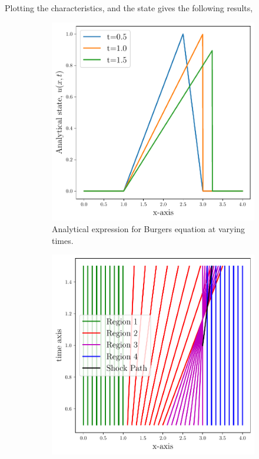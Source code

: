 \begin{adjustwidth}{2.5em}{0pt}
    Plotting the characteristics, and the state gives the following results,

    \begin{figure}[h]
        \centering
        \begin{subfigure}[b]{0.45\linewidth}
            \centering
            \includegraphics[width = \linewidth]{q1/analytical.pdf}
            \caption{Analytical expression for Burgers equation at varying times.}
            \label{fig:analytical}
        \end{subfigure}
        \begin{subfigure}[b]{0.45\linewidth}
            \centering
            \includegraphics[width = \linewidth]{q1/characteristics.pdf}

\end{subfigure}
\end{figure}
\end{adjustwidth}
